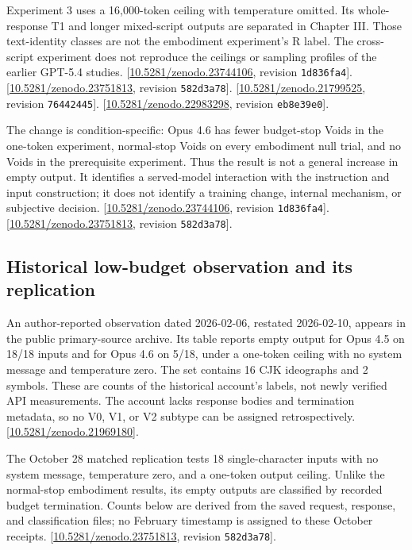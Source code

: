 \documentclass[11pt,letterpaper]{article}
\begin{document}
Experiment 3 uses a 16,000-token ceiling with temperature omitted. Its whole-response T1 and longer mixed-script outputs are separated in Chapter III. Those text-identity classes are not the embodiment experiment’s R label. The cross-script experiment does not reproduce the ceilings or sampling profiles of the earlier GPT-5.4 studies. [\href{https://doi.org/10.5281/zenodo.23744106}{10.5281/zenodo.23744106}, revision \texttt{1d836fa4}]. [\href{https://doi.org/10.5281/zenodo.23751813}{10.5281/zenodo.23751813}, revision \texttt{582d3a78}]. [\href{https://doi.org/10.5281/zenodo.21799525}{10.5281/zenodo.21799525}, revision \texttt{76442445}]. [\href{https://doi.org/10.5281/zenodo.22983298}{10.5281/zenodo.22983298}, revision \texttt{eb8e39e0}].

The change is condition-specific: Opus 4.6 has fewer budget-stop Voids in the one-token experiment, normal-stop Voids on every embodiment null trial, and no Voids in the prerequisite experiment. Thus the result is not a general increase in empty output. It identifies a served-model interaction with the instruction and input construction; it does not identify a training change, internal mechanism, or subjective decision. [\href{https://doi.org/10.5281/zenodo.23744106}{10.5281/zenodo.23744106}, revision \texttt{1d836fa4}]. [\href{https://doi.org/10.5281/zenodo.23751813}{10.5281/zenodo.23751813}, revision \texttt{582d3a78}].

\clearpage\subsection*{Historical low-budget observation and its replication}
An author-reported observation dated 2026-02-06, restated 2026-02-10, appears in the public primary-source archive. Its table reports empty output for Opus 4.5 on 18/18 inputs and for Opus 4.6 on 5/18, under a one-token ceiling with no system message and temperature zero. The set contains 16 CJK ideographs and 2 symbols. These are counts of the historical account’s labels, not newly verified API measurements. The account lacks response bodies and termination metadata, so no V0, V1, or V2 subtype can be assigned retrospectively. [\href{https://doi.org/10.5281/zenodo.21969180}{10.5281/zenodo.21969180}].

The October 28 matched replication tests 18 single-character inputs with no system message, temperature zero, and a one-token output ceiling. Unlike the normal-stop embodiment results, its empty outputs are classified by recorded budget termination. Counts below are derived from the saved request, response, and classification files; no February timestamp is assigned to these October receipts. [\href{https://doi.org/10.5281/zenodo.23751813}{10.5281/zenodo.23751813}, revision \texttt{582d3a78}].
\end{document}
